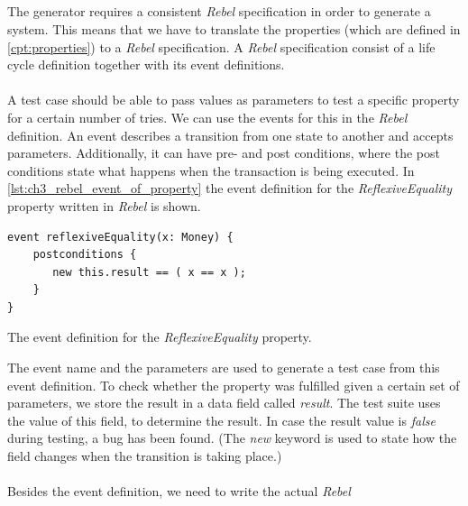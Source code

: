 \subsection{\tfPhaseOne{}}
\label{sct:3_prop_to_rebel}
The generator requires a consistent \textit{Rebel} specification in order to
generate a system. This means that we have to translate the properties (which
are defined in \autoref{cpt:properties}) to a \textit{Rebel} specification. A
\textit{Rebel} specification consist of a life cycle definition together with
its event definitions.\\
\\
A test case should be able to pass values as parameters to test a specific
property for a certain number of tries. We can use the events for this in the
\textit{Rebel} definition. An event describes a transition from one state to
another and accepts parameters. Additionally, it can have pre- and
post conditions, where the post conditions state what happens when the transaction
is being executed. In \autoref{lst:ch3_rebel_event_of_property} the event
definition for the \textit{ReflexiveEquality} property written in \textit{Rebel}
is shown.
\begin{sourcecode}[!ht]
\begin{lstlisting}[language=Rebel]
event reflexiveEquality(x: Money) {
    postconditions {
       new this.result == ( x == x );
    }
}
\end{lstlisting}
\caption{The event definition for the \textit{ReflexiveEquality} property.}
\label{lst:ch3_rebel_event_of_property}
\end{sourcecode}
\FloatBarrier
The event name and the parameters are used to generate a test case from this
event definition. To check whether the property was fulfilled given a certain
set of parameters, we store the result in a data field called \textit{result}.
The test suite uses the value of this field, to determine the result. In case
the result value is \textit{false} during testing, a bug has been found. (The
\textit{new} keyword is used to state how the field changes when the transition
is taking place.)\\
\\
Besides the event definition, we need to write the actual \textit{Rebel}
